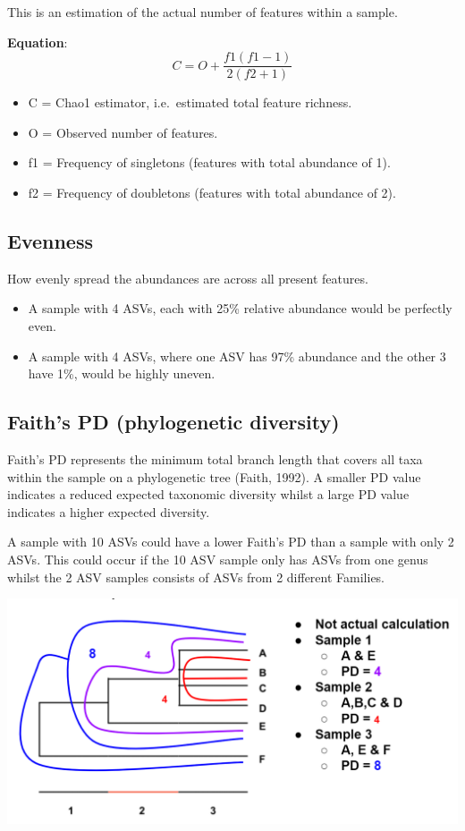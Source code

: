 \documentclass[
]{book}
\providecommand{\tightlist}{%
  \setlength{\itemsep}{0pt}\setlength{\parskip}{0pt}}
\begin{document}
This is an estimation of the actual number of features within a sample.

\textbf{Equation}:
\[
C = 
O + 
\frac{f1(f1-1)}
{2(f2 + 1)}
\]

\begin{itemize}
\tightlist
\item
  C = Chao1 estimator, i.e.~estimated total feature richness.
\item
  O = Observed number of features.
\item
  f1 = Frequency of singletons (features with total abundance of 1).
\item
  f2 = Frequency of doubletons (features with total abundance of 2).
\end{itemize}

\hypertarget{evenness}{%
\subsection{Evenness}\label{evenness}}

How evenly spread the abundances are across all present features.

\begin{itemize}
\tightlist
\item
  A sample with 4 ASVs, each with 25\% relative abundance would be perfectly even.
\item
  A sample with 4 ASVs, where one ASV has 97\% abundance and the other 3 have 1\%, would be highly uneven.
\end{itemize}

\hypertarget{faith}{%
\subsection{Faith's PD (phylogenetic diversity)}\label{faith}}

Faith's PD represents the minimum total branch length that covers all taxa within the sample on a phylogenetic tree (Faith, 1992). A smaller PD value indicates a reduced expected taxonomic diversity whilst a large PD value indicates a higher expected diversity.

A sample with 10 ASVs could have a lower Faith's PD than a sample with only 2 ASVs. This could occur if the 10 ASV sample only has ASVs from one genus whilst the 2 ASV samples consists of ASVs from 2 different Families.

\includegraphics{figures/faith_pd.png}
\end{document}
